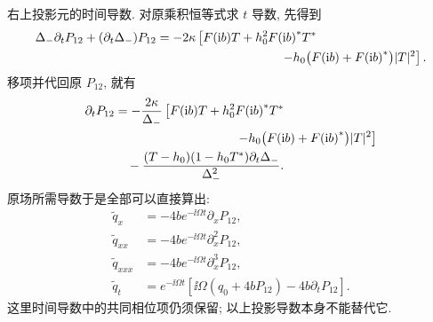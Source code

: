 \par\smallskip\noindent 右上投影元的时间导数.\quad
对原乘积恒等式求 $t$ 导数, 先得到
\begin{align*}
\Delta_-\partial_tP_{12}
+(\partial_t\Delta_-)P_{12}
&=-2\kappa\left[
F(\ii b)T+h_0^2\conj{F(\ii b)}\conj{T}\right.\\
&\hspace{35mm}\left.
-h_0\bigl(F(\ii b)+\conj{F(\ii b)}\bigr)|T|^2
\right].
\end{align*}
移项并代回原 $P_{12}$, 就有
\begin{align*}
\partial_tP_{12}
&=-\dfrac{2\kappa}{\Delta_-}
\left[F(\ii b)T+h_0^2\conj{F(\ii b)}\conj{T}\right.\\
&\hspace{34mm}\left.
-h_0\bigl(F(\ii b)+\conj{F(\ii b)}\bigr)|T|^2\right]\\
&\quad-\dfrac{(T-h_0)(1-h_0\conj{T})
\partial_t\Delta_-}{\Delta_-^2}.
\end{align*}
原场所需导数于是全部可以直接算出:
\begin{align*}
\widetilde q_x
&=-4b e^{-\ii\Omega t}\partial_xP_{12},\\
\widetilde q_{xx}
&=-4b e^{-\ii\Omega t}\partial_x^2P_{12},\\
\widetilde q_{xxx}
&=-4b e^{-\ii\Omega t}\partial_x^3P_{12},\\
\widetilde q_t
&=e^{-\ii\Omega t}
\left[\ii\Omega(q_0+4bP_{12})-4b\partial_tP_{12}\right].
\end{align*}
这里时间导数中的共同相位项仍须保留; 以上投影导数本身不能替代它.

